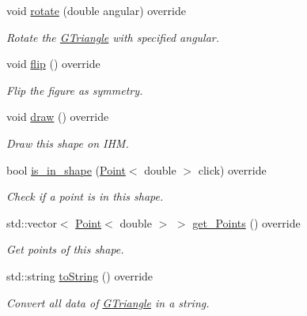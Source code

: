 \begin{DoxyCompactItemize}
void \hyperlink{classGTriangle_ae3ed75bbad4ba7fed68bc06c5834cfbe}{rotate} (double angular) override
\begin{DoxyCompactList}\small\item\em Rotate the \hyperlink{classGTriangle}{G\+Triangle} with specified angular. \end{DoxyCompactList}\item 
\mbox{\label{classGTriangle_ab223d049ce2518095201b99c8940e724}} 
void \hyperlink{classGTriangle_ab223d049ce2518095201b99c8940e724}{flip} () override
\begin{DoxyCompactList}\small\item\em Flip the figure as symmetry. \end{DoxyCompactList}\item 
\mbox{\label{classGTriangle_adb7a211b65860ce4dfcc13275cd5052d}} 
void \hyperlink{classGTriangle_adb7a211b65860ce4dfcc13275cd5052d}{draw} () override
\begin{DoxyCompactList}\small\item\em Draw this shape on I\+HM. \end{DoxyCompactList}\item 
bool \hyperlink{classGTriangle_a7e5d4eefbb2e42b9c3142096a23dcb19}{is\+\_\+in\+\_\+shape} (\hyperlink{classPoint}{Point}$<$ double $>$ click) override
\begin{DoxyCompactList}\small\item\em Check if a point is in this shape. \end{DoxyCompactList}\item 
std\+::vector$<$ \hyperlink{classPoint}{Point}$<$ double $>$ $>$ \hyperlink{classGTriangle_add4581d1b52836142de5817de4d52d17}{get\+\_\+\+Points} () override
\begin{DoxyCompactList}\small\item\em Get points of this shape. \end{DoxyCompactList}\item 
std\+::string \hyperlink{classGTriangle_a8381aeea39fac0d52ad9e0d45b791b3b}{to\+String} () override
\begin{DoxyCompactList}\small\item\em Convert all data of \hyperlink{classGTriangle}{G\+Triangle} in a string. \end{DoxyCompactList}\end{DoxyCompactItemize}


